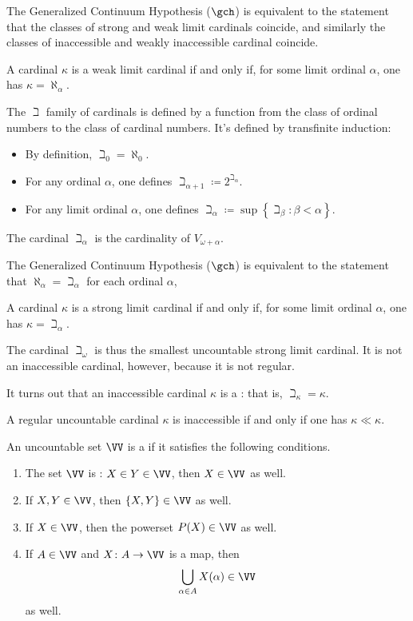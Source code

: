 The Generalized Continuum Hypothesis ($ \gch $) is equivalent to the statement that
the classes of strong and weak limit cardinals coincide,
and similarly the classes of inaccessible and weakly inaccessible cardinal coincide.

\begin{eg}
	A cardinal $ \kappa $ is a weak limit cardinal if and only if,
	for some limit ordinal $ \alpha $, one has $ \kappa = \aleph_{\alpha} $.
\end{eg}

\begin{eg}
	The $\beth$ family of cardinals is defined by a function from the class of ordinal numbers to the class of cardinal numbers.
	It's defined by transfinite induction:
	\begin{itemize}
		\item By definition, $ \beth_0 = \aleph_0 $.
		\item For any ordinal $ \alpha $, one defines $ \beth_{\alpha+1} \coloneq 2^{\beth_{\alpha}} $.
		\item For any limit ordinal $ \alpha $,
			one defines $ \beth_{\alpha} \coloneq \sup \left\{ \beth_{\beta} : \beta < \alpha \right\} $.
	\end{itemize}
	The cardinal $ \beth_{\alpha} $ is the cardinality of $ V_{\omega+\alpha} $.

	The Generalized Continuum Hypothesis ($ \gch $) is equivalent to the statement that
	$ \aleph_{\alpha} = \beth_{\alpha} $ for each ordinal $ \alpha $,	
	
	A cardinal $ \kappa $ is a strong limit cardinal if and only if,
	for some limit ordinal $ \alpha $, one has $ \kappa = \beth_{\alpha} $.

	The cardinal $ \beth_{\omega} $ is thus the smallest uncountable strong limit cardinal.
	It is not an inaccessible cardinal, however, because it is not regular.

	It turns out that an inaccessible cardinal $ \kappa $ is a :
	that is, $ \beth_{\kappa} = \kappa $.
\end{eg}

\begin{definition}
	A regular uncountable cardinal $ \kappa $ is inaccessible if and only if
	one has $ \kappa \ll \kappa $.
\end{definition}

\begin{definition}%
\label{dfn:uni}
	An uncountable set $\VV$ is a  if it satisfies the following conditions.
	\begin{enumerate}
		\item The set $\VV$ is : $X\in Y\in\VV$, then $X\in\VV$ as well.
		\item If $X,Y\in\VV$, then $\{X,Y\}\in\VV$ as well.
		\item If $X\in\VV$, then the powerset $P(X)\in\VV$ as well.
		\item If $A\in\VV$ and $X \colon A \to \VV$ is a map, then
		\[
			\bigcup_{\alpha\in A}X(\alpha) \in \VV
		\]
		as well.
	\end{enumerate}
\end{definition}

